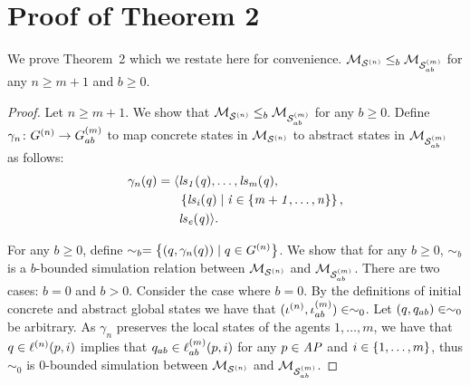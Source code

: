 \documentclass{article}
\newenvironment{customthm}[1]
  {\renewcommand\theinnercustomthm{#1}\innercustomthm}
  {\endinnercustomthm}
\begin{document}
\section{Proof of Theorem 2}
We prove Theorem~2 which we restate here for convenience.
\begin{customthm}{2}
$\mathcal{M}_{\mathcal{S}^{(n)}} \leq_b \mathcal{M}_{\mathcal{S}_{ab}^{(m)}}$ for any $n \geq m+1$ and $b \geq 0$.
\end{customthm}
\begin{proof}
Let $n \geq m+1$. We show that $\mathcal{M}_{\mathcal{S}^{(n)}}
\leq_b \mathcal{M}_{\mathcal{S}_{ab}^{(m)}}$ for any $b \geq 0$.
 Define $\gamma_n
\colon G^{(n)} \rightarrow G^{(m)}_{ab}$ to map concrete states in
$\mathcal{M}_{\mathcal{S}^{(n)}}$ to abstract states in $\mathcal{M}_{\mathcal{S}_{ab}^{(m)}}$ as follows:
\begin{align*}
  \gamma_n(q) =  \langle &\it{ls}_{1}(q), \ldots, \it{ls}_{m}(q), \\
  &\left \{ \it{ls}_{i}(q) \mid i \in \left \{ m + 1, \ldots, n \right \} \right \}, \\
  &\it{ls}_{e}(q)  \rangle.
\end{align*}

For any $b \geq 0$, define $\sim_b = \left \{ (q, \gamma_n(q)) \mid q \in
    G^{(n)}  \right \}$. We show that for any $b \geq 0$, $\sim_b$ is a
    $b$-bounded simulation relation between $\mathcal{M}_{\mathcal{S}^{(n)}}$ and $\mathcal{M}_{\mathcal{S}_{ab}^{(m)}}$. There are
    two cases: $b=0$ and $b >0$. Consider the case where $b=0$. By the
    definitions of initial concrete and abstract global states we have that
    $(\iota^{({n})}, \iota^{({m})}_{ab}) \in \sim_0$. Let $(q, q_{ab}) \in
    \sim_0$ be arbitrary. As $\gamma_n$ preserves the local states of the
    agents $1, \ldots, m$, we have that $q \in \ell^{(n)}(p, i)$ implies that
    $q_{ab} \in \ell^{(m)}_{ab}(p, i)$ for any $p \in \it{AP}$ and $i \in
    \left \{ 1, \ldots, m \right \}$, thus $\sim_0$ is $0$-bounded simulation between $\mathcal{M}_{\mathcal{S}^{(n)}}$ and $\mathcal{M}_{\mathcal{S}_{ab}^{(m)}}$.  


\end{proof}
\end{document}
